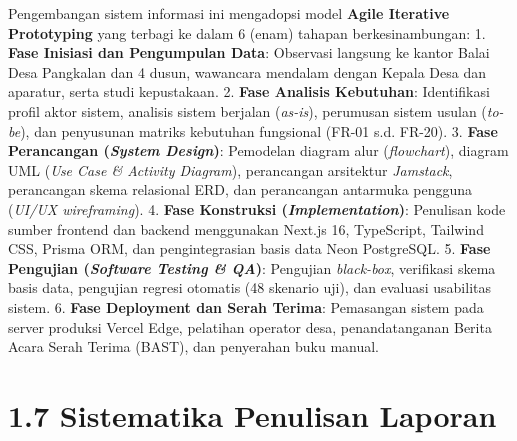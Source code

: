\documentclass[
  indonesian,
  12pt,
]{report}
\begin{document}
Pengembangan sistem informasi ini mengadopsi model \textbf{Agile
Iterative Prototyping} yang terbagi ke dalam 6 (enam) tahapan
berkesinambungan: 1. \textbf{Fase Inisiasi dan Pengumpulan Data}:
Observasi langsung ke kantor Balai Desa Pangkalan dan 4 dusun, wawancara
mendalam dengan Kepala Desa dan aparatur, serta studi kepustakaan. 2.
\textbf{Fase Analisis Kebutuhan}: Identifikasi profil aktor sistem,
analisis sistem berjalan (\emph{as-is}), perumusan sistem usulan
(\emph{to-be}), dan penyusunan matriks kebutuhan fungsional (FR-01 s.d.
FR-20). 3. \textbf{Fase Perancangan (\emph{System Design})}: Pemodelan
diagram alur (\emph{flowchart}), diagram UML (\emph{Use Case \& Activity
Diagram}), perancangan arsitektur \emph{Jamstack}, perancangan skema
relasional ERD, dan perancangan antarmuka pengguna (\emph{UI/UX
wireframing}). 4. \textbf{Fase Konstruksi (\emph{Implementation})}:
Penulisan kode sumber frontend dan backend menggunakan Next.js 16,
TypeScript, Tailwind CSS, Prisma ORM, dan pengintegrasian basis data
Neon PostgreSQL. 5. \textbf{Fase Pengujian (\emph{Software Testing \&
QA})}: Pengujian \emph{black-box}, verifikasi skema basis data,
pengujian regresi otomatis (48 skenario uji), dan evaluasi usabilitas
sistem. 6. \textbf{Fase Deployment dan Serah Terima}: Pemasangan sistem
pada server produksi Vercel Edge, pelatihan operator desa,
penandatanganan Berita Acara Serah Terima (BAST), dan penyerahan buku
manual.

\section{1.7 Sistematika Penulisan
Laporan}\label{sistematika-penulisan-laporan}
\end{document}
